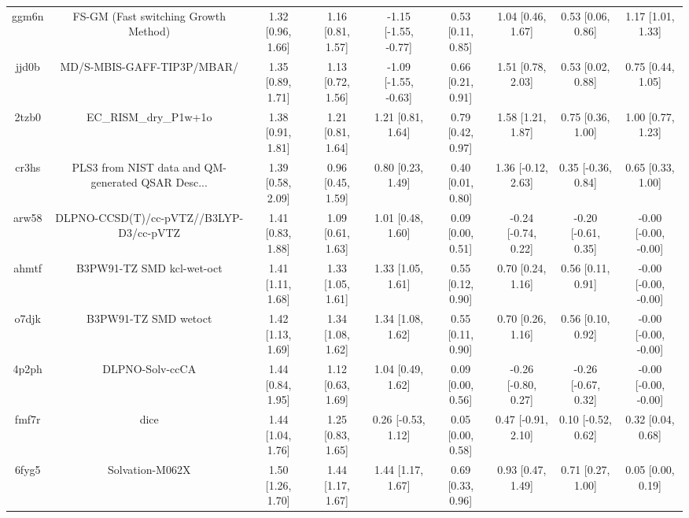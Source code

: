 \documentclass{article}
\begin{document}
\begin{center}
\begin{longtable}{|ccccccccc|}
 ggm6n &               FS-GM (Fast switching Growth Method) &  1.32 [0.96, 1.66] &  1.16 [0.81, 1.57] &  -1.15 [-1.55, -0.77] &  0.53 [0.11, 0.85] &    1.04 [0.46, 1.67] &    0.53 [0.06, 0.86] &     1.17 [1.01, 1.33] \\
 jjd0b &                         MD/S-MBIS-GAFF-TIP3P/MBAR/ &  1.35 [0.89, 1.71] &  1.13 [0.72, 1.56] &  -1.09 [-1.55, -0.63] &  0.66 [0.21, 0.91] &    1.51 [0.78, 2.03] &    0.53 [0.02, 0.88] &     0.75 [0.44, 1.05] \\
 2tzb0 &                              EC\_RISM\_dry\_P1w+1o &  1.38 [0.91, 1.81] &  1.21 [0.81, 1.64] &     1.21 [0.81, 1.64] &  0.79 [0.42, 0.97] &    1.58 [1.21, 1.87] &    0.75 [0.36, 1.00] &     1.00 [0.77, 1.23] \\
 cr3hs &  PLS3 from NIST data and QM-generated QSAR Desc... &  1.39 [0.58, 2.09] &  0.96 [0.45, 1.59] &     0.80 [0.23, 1.49] &  0.40 [0.01, 0.80] &   1.36 [-0.12, 2.63] &   0.35 [-0.36, 0.84] &     0.65 [0.33, 1.00] \\
 arw58 &            DLPNO-CCSD(T)/cc-pVTZ//B3LYP-D3/cc-pVTZ &  1.41 [0.83, 1.88] &  1.09 [0.61, 1.63] &     1.01 [0.48, 1.60] &  0.09 [0.00, 0.51] &  -0.24 [-0.74, 0.22] &  -0.20 [-0.61, 0.35] &  -0.00 [-0.00, -0.00] \\
 ahmtf &                          B3PW91-TZ SMD kcl-wet-oct &  1.41 [1.11, 1.68] &  1.33 [1.05, 1.61] &     1.33 [1.05, 1.61] &  0.55 [0.12, 0.90] &    0.70 [0.24, 1.16] &    0.56 [0.11, 0.91] &  -0.00 [-0.00, -0.00] \\
 o7djk &                               B3PW91-TZ SMD wetoct &  1.42 [1.13, 1.69] &  1.34 [1.08, 1.62] &     1.34 [1.08, 1.62] &  0.55 [0.11, 0.90] &    0.70 [0.26, 1.16] &    0.56 [0.10, 0.92] &  -0.00 [-0.00, -0.00] \\
 4p2ph &                                    DLPNO-Solv-ccCA &  1.44 [0.84, 1.95] &  1.12 [0.63, 1.69] &     1.04 [0.49, 1.62] &  0.09 [0.00, 0.56] &  -0.26 [-0.80, 0.27] &  -0.26 [-0.67, 0.32] &  -0.00 [-0.00, -0.00] \\
 fmf7r &                                               dice &  1.44 [1.04, 1.76] &  1.25 [0.83, 1.65] &    0.26 [-0.53, 1.12] &  0.05 [0.00, 0.58] &   0.47 [-0.91, 2.10] &   0.10 [-0.52, 0.62] &     0.32 [0.04, 0.68] \\
 6fyg5 &                                    Solvation-M062X &  1.50 [1.26, 1.70] &  1.44 [1.17, 1.67] &     1.44 [1.17, 1.67] &  0.69 [0.33, 0.96] &    0.93 [0.47, 1.49] &    0.71 [0.27, 1.00] &     0.05 [0.00, 0.19] \\

\end{longtable}
\end{center}
\end{document}

